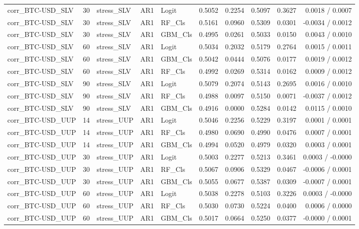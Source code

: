 \begin{table}[H]
\begin{tabular}{lllllrrrrr}
corr_BTC-USD_SLV & 30 & stress_SLV & AR1 & Logit & 0.5052 & 0.2254 & 0.5097 & 0.3627 & 0.0018 / 0.0007 \\
corr_BTC-USD_SLV & 30 & stress_SLV & AR1 & RF_Cls & 0.5161 & 0.0960 & 0.5309 & 0.0301 & -0.0034 / 0.0012 \\
corr_BTC-USD_SLV & 30 & stress_SLV & AR1 & GBM_Cls & 0.4995 & 0.0261 & 0.5033 & 0.0150 & 0.0043 / 0.0010 \\
corr_BTC-USD_SLV & 60 & stress_SLV & AR1 & Logit & 0.5034 & 0.2032 & 0.5179 & 0.2764 & 0.0015 / 0.0011 \\
corr_BTC-USD_SLV & 60 & stress_SLV & AR1 & GBM_Cls & 0.5042 & 0.0444 & 0.5076 & 0.0177 & 0.0019 / 0.0012 \\
corr_BTC-USD_SLV & 60 & stress_SLV & AR1 & RF_Cls & 0.4992 & 0.0269 & 0.5314 & 0.0162 & 0.0009 / 0.0012 \\
corr_BTC-USD_SLV & 90 & stress_SLV & AR1 & Logit & 0.5079 & 0.2074 & 0.5143 & 0.2695 & 0.0016 / 0.0010 \\
corr_BTC-USD_SLV & 90 & stress_SLV & AR1 & RF_Cls & 0.4988 & 0.0097 & 0.5150 & 0.0071 & -0.0037 / 0.0012 \\
corr_BTC-USD_SLV & 90 & stress_SLV & AR1 & GBM_Cls & 0.4916 & 0.0000 & 0.5284 & 0.0142 & 0.0115 / 0.0010 \\
corr_BTC-USD_UUP & 14 & stress_UUP & AR1 & Logit & 0.5046 & 0.2256 & 0.5229 & 0.3197 & 0.0001 / 0.0001 \\
corr_BTC-USD_UUP & 14 & stress_UUP & AR1 & RF_Cls & 0.4980 & 0.0690 & 0.4990 & 0.0476 & 0.0007 / 0.0001 \\
corr_BTC-USD_UUP & 14 & stress_UUP & AR1 & GBM_Cls & 0.4994 & 0.0520 & 0.4979 & 0.0320 & 0.0003 / 0.0001 \\
corr_BTC-USD_UUP & 30 & stress_UUP & AR1 & Logit & 0.5003 & 0.2277 & 0.5213 & 0.3461 & 0.0003 / -0.0000 \\
corr_BTC-USD_UUP & 30 & stress_UUP & AR1 & RF_Cls & 0.5067 & 0.0906 & 0.5329 & 0.0467 & -0.0006 / 0.0001 \\
corr_BTC-USD_UUP & 30 & stress_UUP & AR1 & GBM_Cls & 0.5055 & 0.0677 & 0.5387 & 0.0309 & -0.0007 / 0.0001 \\
corr_BTC-USD_UUP & 60 & stress_UUP & AR1 & Logit & 0.5038 & 0.2278 & 0.5103 & 0.3226 & 0.0003 / -0.0000 \\
corr_BTC-USD_UUP & 60 & stress_UUP & AR1 & RF_Cls & 0.5030 & 0.0730 & 0.5224 & 0.0400 & 0.0006 / 0.0000 \\
corr_BTC-USD_UUP & 60 & stress_UUP & AR1 & GBM_Cls & 0.5017 & 0.0664 & 0.5250 & 0.0377 & -0.0000 / 0.0001 \\

\end{tabular}
\end{table}
